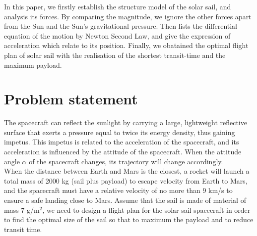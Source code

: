 \documentclass[../Paper.tex]{subfiles}
\begin{document}
In this paper, we firstly establish the structure model of the solar sail, and analysis its forces. By comparing the magnitude, we ignore the other forces apart from the Sun and the Sun's gravitational pressure. Then lists the differential equation of the motion by Newton Second Law, and give the expression of acceleration which relate to its position. Finally, we obatained the optimal flight plan of solar sail with the realisation of the shortest transit-time and the maximum payload. 

\section{Problem statement}

The spacecraft can reflect the sunlight by carrying a large, lightweight reflective surface that exerts a pressure equal to twice its energy density, thus gaining impetus. This impetus is related to the acceleration of the spacecraft, and its acceleration is influenced by the attitude of the spacecraft. When the attitude angle $\alpha$ of the spacecraft changes, its trajectory will change accordingly. 
\\

When the distance between Earth and Mars is the closest, a rocket will launch a total mass of 2000 kg (sail plus payload) to escape velocity from Earth to Mars, and the spacecraft must have a relative velocity of no more than 9 km/s to ensure a safe landing close to Mars. Assume that the sail is made of material of mass 7 g/m$^2$, we need to design a flight plan for the solar sail spacecraft in order to find the optimal size of the sail so that to maximum the payload and to reduce transit time.


 
\end{document}
